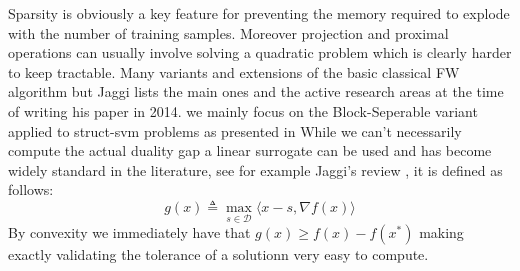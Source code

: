 \clearpage
Sparsity is obviously a key feature for preventing the memory required to
explode with the number of training samples. Moreover projection and proximal
operations can usually involve solving a quadratic problem which is clearly
harder to keep tractable. Many variants and extensions of the basic classical FW
algorithm but Jaggi lists the main ones and the active research areas at the
time of writing his paper in 2014. %
we mainly focus on the Block-Seperable variant applied to struct-svm problems as
presented in \citet{lacoste-julienBlockCoordinateFrankWolfeOptimization2013}
While we can't necessarily compute the  actual duality gap
a linear surrogate can be used and has become widely standard
in the literature, see for example Jaggi's review
\citep{jaggiRevisitingFrankWolfeProjectionFree2013},
it is defined as follows:
\begin{equation}
  g(x) \triangleq \max_{s\in \mathcal D} \langle x-s,\nabla f(x)\rangle
\end{equation} 
By convexity we immediately have that $g(x) \geq f(x) - f(x^*)$ making
exactly validating the tolerance of a solutionn very easy to compute.
